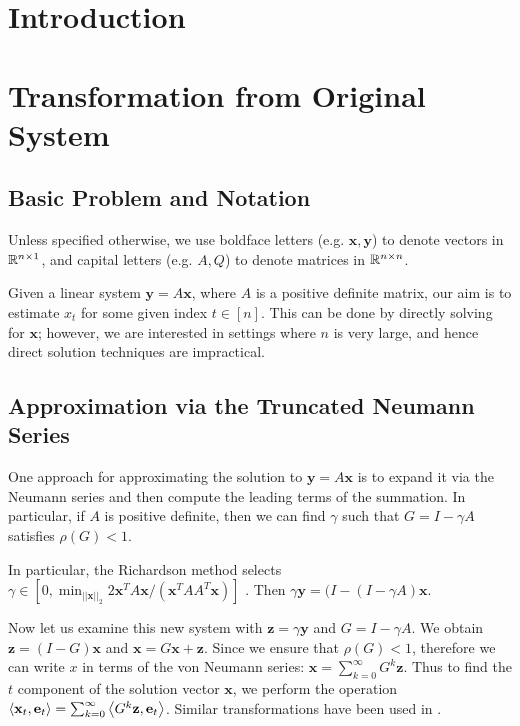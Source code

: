 \section{Introduction}

\section{Transformation from Original System}

\subsection{Basic Problem and Notation}

Unless specified otherwise, we use boldface letters (e.g. $\mathbf{x},\mathbf{y}$) to denote vectors in $\mathbb{R}^{n\times 1}$, and capital letters (e.g. $A,Q$) to denote matrices in $\mathbb{R}^{n\times n}$.

Given a linear system $\mathbf{y} = A\mathbf{x}$, where $A$ is a positive definite matrix, our aim is to estimate $x_t$ for some given index $t\in[n]$. 
This can be done by directly solving for $\mathbf{x}$; however, we are interested in settings where $n$ is very large, and hence direct solution techniques are impractical. 

\subsection{Approximation via the Truncated Neumann Series}

One approach for approximating the solution to $\mathbf{y} = A\mathbf{x}$ is to expand it via the Neumann series and then compute the leading terms of the summation.
In particular, if $A$ is positive definite, then we can find $\gamma$ such that $G = I - \gamma A$ satisfies $\rho(G) < 1$. 

In particular, the Richardson method selects $\gamma \in [0, \min_{||\mathbf{x}||_2} 2\mathbf{x}^TA\mathbf{x}/(\mathbf{x}^TAA^T\mathbf{x})]$ \cite{lee2014asynchronous}.
Then $\gamma\mathbf{y} = (I - (I - \gamma A)\mathbf{x}$.

Now let us examine this new system with $\mathbf{z} = \gamma \mathbf{y}$ and $G = I - \gamma A$. 
We obtain $\mathbf{z} = (I - G)\mathbf{x}$ and $\mathbf{x} = G\mathbf{x} + \mathbf{z}$. 
Since we ensure that $\rho(G)<1$, therefore we can write $x$ in terms of the von Neumann series: $\mathbf{x} = \sum_{k=0}^\infty G^k \mathbf{z}$. 
Thus to find the $t$ component of the solution vector $\mathbf{x}$, we perform the operation $\left< \mathbf{x}_t, \mathbf{e}_t \right> = \sum_{k=0}^\infty \left< G^k \mathbf{z}, \mathbf{e}_t \right>$. 
Similar transformations have been used in \cite{dimov2015new, lee2014asynchronous, wu2016multi}.

